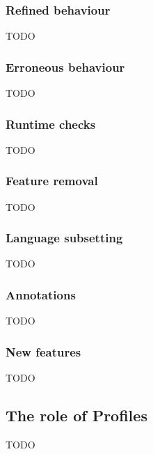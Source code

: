 

\subsubsection{Refined behaviour}

TODO


\subsubsection{Erroneous behaviour}

TODO


\subsubsection{Runtime checks}

TODO

\subsubsection{Feature removal}

TODO

\subsubsection{Language subsetting}

TODO


\subsubsection{Annotations}

TODO

\subsubsection{New features}

TODO

\subsection{The role of Profiles}

TODO


